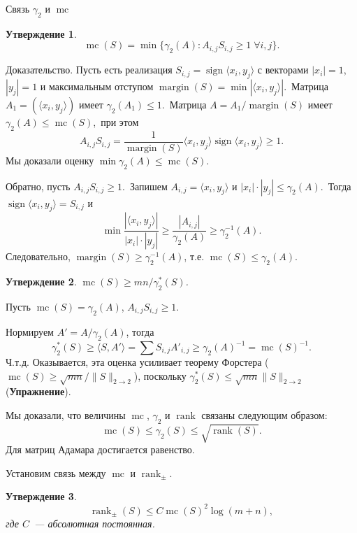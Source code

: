 \documentclass[handout]{beamer}
\renewcommand\le{\leqslant}
\renewcommand\ge{\geqslant}
\newtheorem*{statement}{Утверждение}
\DeclareMathOperator{\rank}{rank}
\DeclareMathOperator{\sign}{sign}
\DeclareMathOperator{\margin}{margin}
\DeclareMathOperator{\mc}{mc}
\begin{document}
\begin{frame}{Связь $\gamma_2$ и $\mc$}

    \begin{statement}
        $$
        \mc(S) = \min\{\gamma_2(A)\colon A_{i,j}S_{i,j}\ge 1\;\forall i,j\}.
        $$
    \end{statement}
    \pause

    Доказательство. Пусть есть реализация $S_{i,j}=\sign\langle x_i,y_j\rangle$ с
    векторами $|x_i|=1$, $|y_j|=1$ и максимальным отступом $\margin(S) = \min|\langle
    x_i,y_j\rangle|$.\pause~Матрица $A_1 = (\langle x_i,y_j\rangle)$ имеет
    $\gamma_2(A_1)\le 1$.\pause~Матрица $A = A_1/\margin(S)$ имеет $\gamma_2(A) \le
    \mc(S)$,\pause~при этом
    $$
    A_{i,j}S_{i,j} = \frac1{\margin(S)}\langle x_i,y_j\rangle \sign\langle x_i,y_j\rangle
    \ge 1.
    $$
    Мы доказали оценку $\min\gamma_2(A) \le \mc(S)$.\pause
    
    Обратно, пусть $A_{i,j}S_{i,j}\ge 1$.\pause~Запишем $A_{i,j}=\langle
    x_i,y_j\rangle$ и $|x_i|\cdot|y_j|\le \gamma_2(A)$.\pause~Тогда $\sign\langle
    x_i,y_j\rangle = S_{i,j}$ и
    $$
    \min\frac{|\langle x_i,y_j\rangle|}{|x_i|\cdot|y_j|} \ge
    \frac{|A_{i,j}|}{\gamma_2(A)} \ge \gamma_2^{-1}(A).
    $$
    \pause
    Следовательно, $\margin(S)\ge\gamma_2^{-1}(A)$, т.е. $\mc(S)\le\gamma_2(A)$.
\end{frame}
\begin{frame}
    \begin{statement}
        $\mc(S)\ge mn/\gamma_2^*(S)$.
    \end{statement}
    \pause\vspace{5pt}

    Пусть $\mc(S)=\gamma_2(A)$, $A_{i,j}S_{i,j}\ge 1$.\pause
    
    Нормируем
    $A'=A/\gamma_2(A)$, тогда
    $$
    \gamma_2^*(S) \ge \langle S,A'\rangle = \sum S_{i,j}A'_{i,j} \ge
    \gamma_2(A)^{-1} = \mc(S)^{-1}.
    $$
    Ч.т.д.
    \pause\vspace{5pt}
    Оказывается, эта оценка усиливает теорему Форстера
    ($\mc(S)\ge\sqrt{mn}/\|S\|_{2\to2}$), поскольку
    $\gamma_2^*(S)\le\sqrt{mn}\|S\|_{2\to2}$ (\textbf{Упражнение}).
\end{frame}
\begin{frame}

    Мы доказали, что величины $\mc$, $\gamma_2$ и $\rank$ связаны следующим
    образом:
    $$
    \mc(S) \le \gamma_2(S) \le \sqrt{\rank(S)}.
    $$
    Для матриц Адамара достигается равенство.
    \pause\vspace{5pt}

    Установим связь между $\mc$ и $\rank_\pm$.
    \pause
    \begin{statement}
        $$
        \rank_\pm(S) \le C\mc(S)^2\log(m+n),
        $$
        где $C$~--- абсолютная постоянная.
    \end{statement}

\end{frame}
\end{document}
